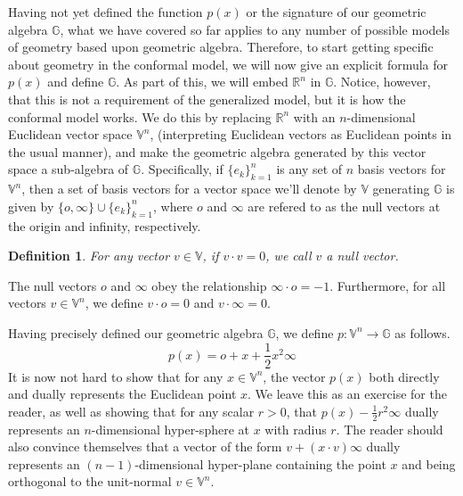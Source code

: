 \documentclass[12pt]{article}
\newcommand{\G}{\mathbb{G}}
\newcommand{\V}{\mathbb{V}}
\newcommand{\R}{\mathbb{R}}
\newcommand{\nvao}{o}
\newcommand{\nvai}{\infty}
\newtheorem{definition}{Definition}[section]
\begin{document}
Having not yet defined the function $p(x)$ or the signature of our
geometric algebra $\G$, what we have covered so far applies to
any number of possible models of geometry based upon geometric algebra.
Therefore, to start getting specific about geometry in the conformal model,
we will now give an explicit formula for $p(x)$ and define $\G$.
As part of this, we will embed $\R^n$ in $\G$.  Notice, however, that
this is not a requirement of the generalized model, but it is how
the conformal model works.
We do this by replacing $\R^n$
with an $n$-dimensional Euclidean vector space $\V^n$, (interpreting
Euclidean vectors as Euclidean points in the usual manner), and
make the geometric algebra generated by this vector space
a sub-algebra of $\G$.  Specifically, if $\{e_k\}_{k=1}^n$ is
any set of $n$ basis vectors for $\V^n$, then a set of
basis vectors for a vector space we'll denote by $\V$ generating $\G$
is given by $\{\nvao,\nvai\}\cup\{e_k\}_{k=1}^n$, where $\nvao$ and $\nvai$ are
refered to as the null vectors
at the origin and infinity, respectively.
\begin{definition}
For any vector $v\in\V$, if $v\cdot v=0$, we call $v$ a null vector.
\end{definition}
The null vectors $\nvao$ and $\nvai$ obey the relationship
$\nvai\cdot\nvao=-1$.  Furthermore, for
all vectors $v\in\V^n$, we define $v\cdot\nvao=0$ and $v\cdot\nvai=0$.

Having precisely defined our geometric algebra $\G$, we define
$p:\V^n\to\G$ as follows.
\begin{equation*}
p(x) = \nvao + x + \frac{1}{2}x^2\nvai
\end{equation*}
It is now not hard to show that for any $x\in\V^n$, the vector $p(x)$
both directly and dually represents the Euclidean point $x$.  We leave
this as an exercise
for the reader, as well as showing that for any scalar $r>0$, that
$p(x)-\frac{1}{2}r^2\nvai$ dually represents an $n$-dimensional hyper-sphere
at $x$ with radius $r$.  The reader should also convince themselves that a
vector of the form $v+(x\cdot v)\nvai$ dually represents an $(n-1)$-dimensional
hyper-plane containing the
point $x$ and being orthogonal to the unit-normal $v\in\V^n$.
\end{document}
